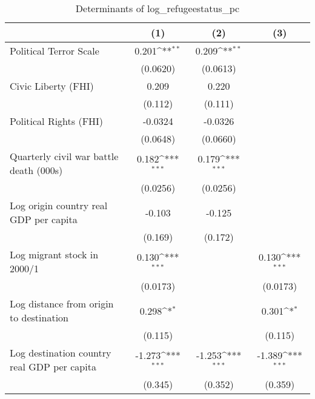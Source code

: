 \begin{table}[htbp]\centering
\def\sym#1{\ifmmode^{#1}\else\(^{#1}\)\fi}
\caption{Determinants of log\_refugeestatus\_pc}
\begin{tabular}{l*{3}{c}}
\hline\hline
                    &\multicolumn{1}{c}{(1)}         &\multicolumn{1}{c}{(2)}         &\multicolumn{1}{c}{(3)}         \\
\hline
Political Terror Scale&       0.201\sym{**} &       0.209\sym{**} &                     \\
                    &    (0.0620)         &    (0.0613)         &                     \\
[1em]
Civic Liberty (FHI) &       0.209         &       0.220         &                     \\
                    &     (0.112)         &     (0.111)         &                     \\
[1em]
Political Rights (FHI)&     -0.0324         &     -0.0326         &                     \\
                    &    (0.0648)         &    (0.0660)         &                     \\
[1em]
Quarterly civil war battle death (000s)&       0.182\sym{***}&       0.179\sym{***}&                     \\
                    &    (0.0256)         &    (0.0256)         &                     \\
[1em]
Log origin country real GDP per capita&      -0.103         &      -0.125         &                     \\
                    &     (0.169)         &     (0.172)         &                     \\
[1em]
Log migrant stock in 2000/1&       0.130\sym{***}&                     &       0.130\sym{***}\\
                    &    (0.0173)         &                     &    (0.0173)         \\
[1em]
Log distance from origin to destination&       0.298\sym{*}  &                     &       0.301\sym{*}  \\
                    &     (0.115)         &                     &     (0.115)         \\
[1em]
Log destination country real GDP per capita&      -1.273\sym{***}&      -1.253\sym{***}&      -1.389\sym{***}\\
                    &     (0.345)         &     (0.352)         &     (0.359)         \\

\end{tabular}
\end{table}
